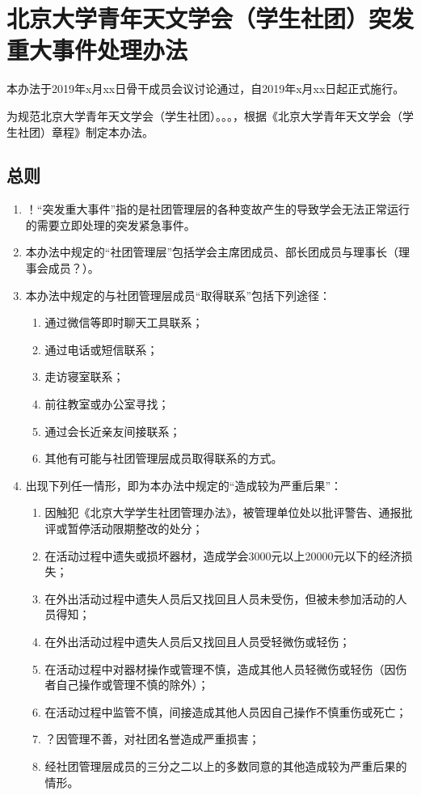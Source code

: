 \chapter{北京大学青年天文学会（学生社团）突发重大事件处理办法}

本办法于2019年x月xx日骨干成员会议讨论通过，自2019年x月xx日起正式施行。

为规范北京大学青年天文学会（学生社团）。。。，根据《北京大学青年天文学会（学生社团）章程》制定本办法。

\section{总则}

\begin{enumerate}
    \item ！“突发重大事件”指的是社团管理层的各种变故产生的导致学会无法正常运行的需要立即处理的突发紧急事件。
    
    \item 本办法中规定的“社团管理层”包括学会主席团成员、部长团成员与理事长（理事会成员？）。
    
    \item 本办法中规定的与社团管理层成员“取得联系”包括下列途径：
    \begin{enumerate}
        \item 通过微信等即时聊天工具联系；
        \item 通过电话或短信联系；
        \item 走访寝室联系；
        \item 前往教室或办公室寻找；
        \item 通过会长近亲友间接联系；
        \item 其他有可能与社团管理层成员取得联系的方式。
    \end{enumerate}
    
    \item 出现下列任一情形，即为本办法中规定的“造成较为严重后果”：
    \begin{enumerate}
        \item 因触犯《北京大学学生社团管理办法》，被管理单位处以批评警告、通报批评或暂停活动限期整改的处分；
        \item 在活动过程中遗失或损坏器材，造成学会3000元以上20000元以下的经济损失；
        \item 在外出活动过程中遗失人员后又找回且人员未受伤，但被未参加活动的人员得知；%
        \item 在外出活动过程中遗失人员后又找回且人员受轻微伤或轻伤；
        \item 在活动过程中对器材操作或管理不慎，造成其他人员轻微伤或轻伤（因伤者自己操作或管理不慎的除外）；
        \item 在活动过程中监管不慎，间接造成其他人员因自己操作不慎重伤或死亡；
        \item ？因管理不善，对社团名誉造成严重损害；
        \item 经社团管理层成员的三分之二以上的多数同意的其他造成较为严重后果的情形。
    \end{enumerate}
    

\end{enumerate}
